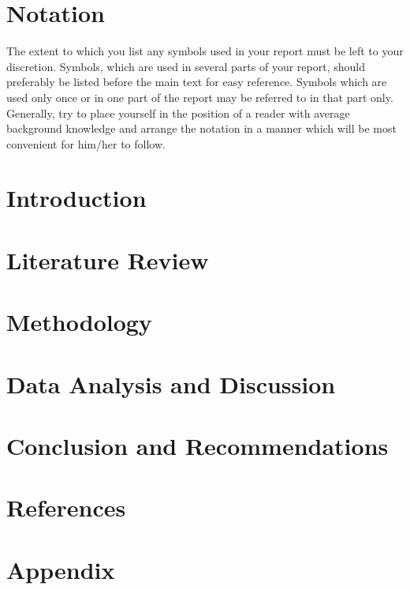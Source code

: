 \documentclass[a4paper,11]{article}
\begin{document}
\section*{Notation}
The extent to which you list any symbols used in your report must be left to your discretion. Symbols, which are used in several parts of your report, should preferably be listed before the main text for easy reference. Symbols which are used only once or in one part of the report may be referred to in that part only. Generally, try to place yourself in the position of a reader with average background knowledge and arrange the notation in a manner which will be most convenient for him/her to follow.
\pagebreak

\tableofcontents
\pagebreak
\listoffigures
\listoftables
\pagebreak
\newpage


\cleardoublepage{}

\section{Introduction}

\pagebreak

\section{Literature Review}

\pagebreak

\section{Methodology}

\pagebreak

\section{Data Analysis and Discussion}

\pagebreak

\section{Conclusion and Recommendations}

\pagebreak

\section{References}

\pagebreak


\section{Appendix}

\end{document}
